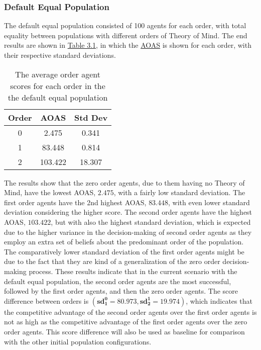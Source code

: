 \subsubsection{Default Equal Population}

The default equal population consisted of 100 agents for each order, with total equality between populations with different orders of Theory of Mind. The end results are shown in \hyperref[table:non-sig-default-equal-simple]{Table 3.1}, in which the \hyperref[eq:aoas]{AOAS} is shown for each order, with their respective standard deviations. 

\begin{table}[h]
\centering
\begin{tabular}{|c|c|c|}
\hline
Order & AOAS & Std Dev \\ \hline
0     & 2.475 & 0.341   \\
1     & 83.448 & 0.814  \\
2     & 103.422 & 18.307 \\ \hline
\end{tabular}
\caption{The average order agent scores for each order in the the default equal population}
\label{table:non-sig-default-equal-simple}
\end{table}

The results show that the zero order agents, due to them having no Theory of Mind, have the lowest AOAS, $\mathbf{2.475}$, with a fairly low standard deviation. The first order agents have the 2nd highest AOAS, $\mathbf{83.448}$, with even lower standard deviation considering the higher score. The second order agents have the highest AOAS, $\mathbf{103.422}$, but with also the highest standard deviation, which is expected due to the higher variance in the decision-making of second order agents as they employ an extra set of beliefs about the predominant order of the population. The comparatively lower standard deviation of the first order agents might be due to the fact that they are kind of a generalization of the zero order decision-making process. These results indicate that in the current scenario with the default equal population, the second order agents are the most successful, followed by the first order agents, and then the zero order agents. The score difference between orders is $(\mathbf{sd^0_1 = 80.973}, \mathbf{sd^1_2 = 19.974})$, which indicates that the competitive advantage of the second order agents over the first order agents is not as high as the competitive advantage of the first order agents over the zero order agents. This score difference will also be used as baseline for comparison with the other initial population configurations.


